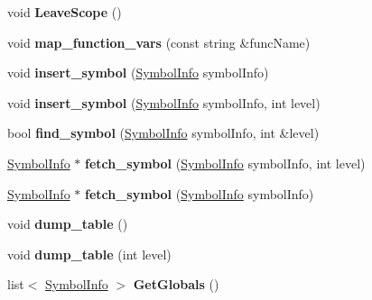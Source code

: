 \begin{DoxyCompactItemize}
\item 
\hypertarget{classSymTab_afd2c44208cdad3ddfc85136136cd27c3}{void {\bfseries Leave\-Scope} ()}\label{classSymTab_afd2c44208cdad3ddfc85136136cd27c3}

\item 
\hypertarget{classSymTab_aaca51de0935bbdbf3fdf434deccccb92}{void {\bfseries map\-\_\-function\-\_\-vars} (const string \&func\-Name)}\label{classSymTab_aaca51de0935bbdbf3fdf434deccccb92}

\item 
\hypertarget{classSymTab_ad8e59e29c50f039570c5844871bf838c}{void {\bfseries insert\-\_\-symbol} (\hyperlink{structSymbolInfo}{Symbol\-Info} symbol\-Info)}\label{classSymTab_ad8e59e29c50f039570c5844871bf838c}

\item 
\hypertarget{classSymTab_a8372047f573c6d84fa231aa7e9842280}{void {\bfseries insert\-\_\-symbol} (\hyperlink{structSymbolInfo}{Symbol\-Info} symbol\-Info, int level)}\label{classSymTab_a8372047f573c6d84fa231aa7e9842280}

\item 
\hypertarget{classSymTab_a2aedd91e00780c889e60a60fc0795daf}{bool {\bfseries find\-\_\-symbol} (\hyperlink{structSymbolInfo}{Symbol\-Info} symbol\-Info, int \&level)}\label{classSymTab_a2aedd91e00780c889e60a60fc0795daf}

\item 
\hypertarget{classSymTab_ac0bfd9c56cfd8e697046178629adbebc}{\hyperlink{structSymbolInfo}{Symbol\-Info} $\ast$ {\bfseries fetch\-\_\-symbol} (\hyperlink{structSymbolInfo}{Symbol\-Info} symbol\-Info, int level)}\label{classSymTab_ac0bfd9c56cfd8e697046178629adbebc}

\item 
\hypertarget{classSymTab_aa977139826a1cdf093078e0527ed1ab3}{\hyperlink{structSymbolInfo}{Symbol\-Info} $\ast$ {\bfseries fetch\-\_\-symbol} (\hyperlink{structSymbolInfo}{Symbol\-Info} symbol\-Info)}\label{classSymTab_aa977139826a1cdf093078e0527ed1ab3}

\item 
\hypertarget{classSymTab_ab4c005eb114053be22fdbe315542f55b}{void {\bfseries dump\-\_\-table} ()}\label{classSymTab_ab4c005eb114053be22fdbe315542f55b}

\item 
\hypertarget{classSymTab_ad5d45136f341bf024a226fe600fb4dcc}{void {\bfseries dump\-\_\-table} (int level)}\label{classSymTab_ad5d45136f341bf024a226fe600fb4dcc}

\item 
\hypertarget{classSymTab_aced837e720830dd9ccb2d3dde621d489}{list$<$ \hyperlink{structSymbolInfo}{Symbol\-Info} $>$ {\bfseries Get\-Globals} ()}\label{classSymTab_aced837e720830dd9ccb2d3dde621d489}


\end{DoxyCompactItemize}
